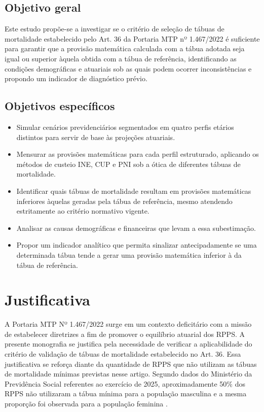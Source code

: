 \subsection{Objetivo geral}
Este estudo propõe-se a investigar se o critério de seleção de tábuas de mortalidade estabelecido pelo Art. 36 da Portaria MTP nº 1.467/2022 é suficiente para garantir que a provisão matemática calculada com a tábua adotada seja igual ou superior àquela obtida com a tábua de referência, identificando as condições demográficas e atuariais sob as quais podem ocorrer inconsistências e propondo um indicador de diagnóstico prévio.

\subsection{Objetivos específicos}

\begin{itemize}
    \item Simular cenários previdenciários segmentados em quatro perfis etários distintos para servir de base às projeções atuariais.

    \item Mensurar as provisões matemáticas para cada perfil estruturado, aplicando os métodos de custeio INE, CUP e PNI sob a ótica de diferentes tábuas de mortalidade.
    
    \item Identificar quais tábuas de mortalidade resultam em provisões matemáticas inferiores àquelas geradas pela tábua de referência, mesmo atendendo estritamente ao critério normativo vigente.
    
    \item Analisar as causas demográficas e financeiras que levam a essa subestimação.
    
    \item Propor um indicador analítico que permita sinalizar antecipadamente se uma determinada tábua tende a gerar uma provisão matemática inferior à da tábua de referência.
\end{itemize}
    
\section{\textbf{Justificativa}}

A Portaria MTP Nº 1.467/2022 surge em um contexto deficitário com a missão de estabelecer diretrizes a fim de promover o equilíbrio atuarial dos RPPS. A presente monografia se justifica pela necessidade de verificar a aplicabilidade do critério de validação de tábuas de mortalidade estabelecido no Art. 36. Essa justificativa se reforça diante da quantidade de RPPS que não utilizam as tábuas de mortalidade mínimas previstas nesse artigo. Segundo dados do Ministério da Previdência Social referentes ao exercício de 2025, aproximadamente 50\% dos RPPS não utilizaram a tábua mínima para a população masculina e a mesma proporção foi observada para a população feminina \cite{brasil_dados_rpps}.

